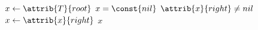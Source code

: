 \begin{codebox}
\li $x \gets \attrib{T}{root}$
\li \If $x = \const{nil}$
\li \Then
		\Return {}
\li \Else
\li 	\While $\attrib{x}{right} \neq nil$
\li 	\Do 
			$x \gets \attrib{x}{right}$
		\End
	\End
\li \Return $x$
\end{codebox}